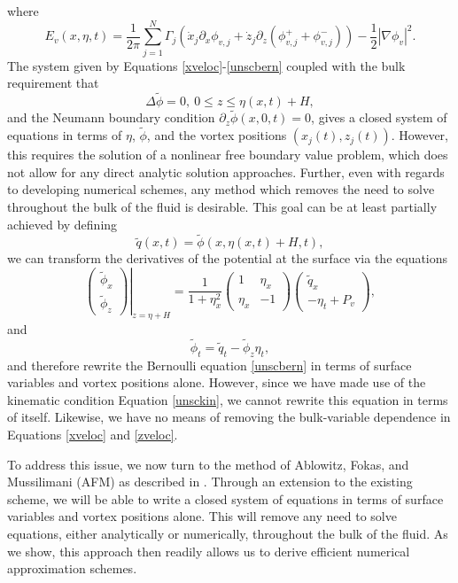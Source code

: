 \documentclass[a4paper,11pt]{article}
\newcommand{\bp}{\begin{pmatrix}}
\newcommand{\ep}{\end{pmatrix}}
\newcommand{\p}{\partial}
\begin{document}
where
\[
E_{v}(x,\eta,t) = \frac{1}{2\pi}\sum_{j=1}^{N}\Gamma_{j}\left(\dot{x}_{j}\p_{x}\phi_{v,j} + \dot{z}_{j} \p_{z}\left(\phi_{v,j}^{+} + \phi_{v,j}^{-}\right)  \right) - \frac{1}{2}\left| \nabla \phi_{v} \right|^{2}.
\]
The system given by Equations \eqref{xveloc}-\eqref{unscbern} coupled with the bulk requirement that 
\begin{equation}
\Delta \tilde{\phi} = 0, ~ 0\leq z \leq \eta(x,t)+H,
\label{harmon} 
\end{equation}
and the Neumann boundary condition $\p_{z}\tilde{\phi}(x,0,t)=0$, gives a closed system of equations in terms of $\eta$, $\tilde{\phi}$, and the vortex positions $(x_{j}(t),z_{j}(t))$.  However, this requires the solution of a nonlinear free boundary value problem, which does not allow for any direct analytic solution approaches.  Further, even with regards to developing numerical schemes, any method which removes the need to solve throughout the bulk of the fluid is desirable.
This goal can be at least partially achieved by defining 
\[
\tilde{q}(x,t) = \tilde{\phi}(x,\eta(x,t)+H,t),
\]
we can transform the derivatives of the potential at the surface via the equations
\begin{equation}
\left.\bp\tilde{\phi}_{x}\\ \tilde{\phi}_{z}\ep\right|_{z=\eta + H} = \frac{1}{1+\eta_{x}^{2}}\bp 1 & \eta_{x}\\ \eta_{x} & -1\ep\bp\tilde{q}_{x} \\  -\eta_{t} + P_{v}\ep,
\label{phitrans}
\end{equation}
and
\begin{equation}
\tilde{\phi}_{t} = \tilde{q}_{t}-\tilde{\phi}_{z}\eta_{t},
\label{phittrans}
\end{equation}
and therefore rewrite the Bernoulli equation \eqref{unscbern} in terms of surface variables and vortex positions alone.  However, since we have made use of the kinematic condition Equation \eqref{unsckin}, we cannot rewrite this equation in terms of itself.  Likewise, we have no means of removing the bulk-variable dependence in Equations \eqref{xveloc} and \eqref{zveloc}.

To address this issue, we now turn to the method of Ablowitz, Fokas, and Mussilimani (AFM) as described in \cite{afm}.  Through an extension to the existing scheme, we will be able to write a closed system of equations in terms of surface variables and vortex positions alone.  This will remove any need to solve equations, either analytically or numerically, throughout the bulk of the fluid.  As we show, this approach then readily allows us to derive efficient numerical approximation schemes.
\end{document}
